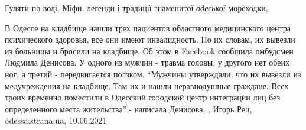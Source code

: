  
 
 
 
 
Гуляти по воді. Міфи, легенди і традиції знаменитої \emph{одеської} мореходки,

В Одессе на кладбище нашли трех пациентов областного медицинского центра
психического здоровья, все они имеют инвалидность. По их словам, их вывезли из
больницы и бросили на кладбище.  Об этом в Facebook сообщила омбудсмен Людмила
Денисова.  У одного из мужчин - травма головы, у другого нет обеих ног, а
третий - передвигается ползком.  \enquote{Мужчины утверждали, что их вывезли из
медучреждения на кладбище. Там их и нашли неравнодушные граждане. Всех троих
временно поместили в Одесский городской центр интеграции лиц без определенного
места жительства},- написала Денисова,
, Игорь Рец, odessa.strana.ua, 10.06.2021


